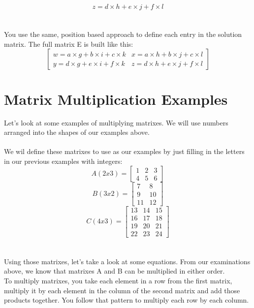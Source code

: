 \documentclass{article}
\begin{document}
\begin{equation}
z= d \times h + e \times j + f \times l
\end{equation}
\\
\\
You use the same, position based approach to define each entry in the solution matrix.
The full matrix E is built like this:
\[
\begin{bmatrix}
	w= a \times g + b \times i + c \times k & x = a \times h + b \times j + c \times l \\
	y = d \times g + e \times i + f \times k & z = d \times h + e \times j + f \times l
\end{bmatrix}
\]



\newpage
\section{Matrix Multiplication Examples}
Let's look at some examples of multiplying matrixes.  We will use numbers arranged into the shapes of our examples above.
\\
\\
We wil define these matrixes to use as our examples by just filling in the letters in our previous examples with integers: 
\[
A (2 x 3) = \begin{bmatrix}
    1  &  2 & 3      \\
    4  &  5 & 6      
\end{bmatrix}
\]
\[
B (3 x 2) = \begin{bmatrix}
    7  &  8      \\
    9  &  10        \\
    11 & 12
\end{bmatrix}
\]
\[
C (4 x 3) = \begin{bmatrix}
    13  &  14 &  15     \\
    16  &  17  &  18     \\
    19  &  20 & 21     \\
    22  &  23 & 24
\end{bmatrix}
\]
\\
\\
Using those matrixes, let's take a look at some equations.  From our examinations above, we know that matrixes A and B can be multiplied in either order.
\\
To multiply matrixes, you take each element in a row from the first matrix, multiply it by each element in the column of the second matrix and add those products together.
You follow that pattern to multiply each row by each column.
\end{document}
